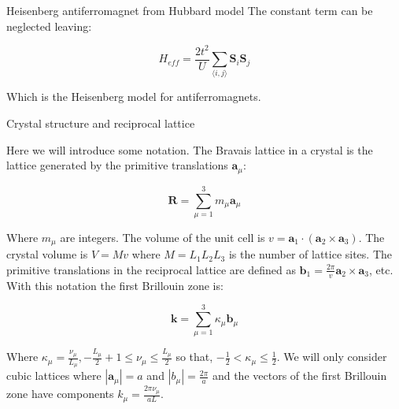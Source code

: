\begin{section}{Heisenberg antiferromagnet from Hubbard model}
The constant term can be neglected leaving:

\begin{equation}
H_{eff} = \frac{2t^2}{U} \sum_{\langle i,j \rangle} \boldsymbol{S}_i\boldsymbol{S}_j
\end{equation}

Which is the Heisenberg model for antiferromagnets. 

\end{section}


\begin{subappendices}
\begin{section}{Crystal structure and reciprocal lattice}
\label{AP1A}

Here we will introduce some notation. The Bravais lattice in a crystal is the lattice generated by the primitive translations $\textbf{a}_\mu$:

\begin{equation}
\textbf{R} = \sum_{\mu=1}^3 m_\mu \textbf{a}_\mu
\end{equation}

Where $m_\mu$ are integers. The volume of the unit cell is $v = \textbf{a}_1 \cdot (\textbf{a}_2 \times \textbf{a}_3)$. The crystal volume is $V = Mv$ where $M = L_1 L_2 L_3$ is the number of lattice sites. The primitive translations in the reciprocal lattice are defined as $\textbf{b}_1 = \frac{2 \pi}{v}\textbf{a}_2 \times \textbf{a}_3$, etc. With this notation the first Brillouin zone is:

\begin{equation}
\textbf{k} = \sum_{\mu=1}^3 \kappa_\mu \textbf{b}_\mu
\end{equation}

Where $\kappa_\mu = \frac{\nu_\mu}{L_\mu}, -\frac{L_\mu}{2}+1 \leq \nu_\mu \leq \frac{L_\mu}{2}$ so that, $-\frac{1}{2} < \kappa_\mu \leq \frac{1}{2}$. We will only consider cubic lattices where $|\textbf{a}_\mu| = a$ and $|b_\mu| = \frac{2\pi}{a}$ and the vectors of the first Brillouin zone have components $k_\mu = \frac{2 \pi \nu_\mu}{aL}$.

\end{section}
\end{subappendices}
